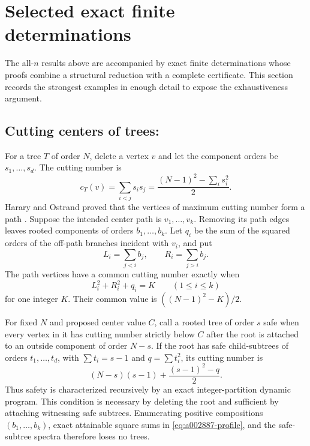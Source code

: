 \section{Selected exact finite determinations}
\label{sec:selected-exact}

The all-\(n\) results above are accompanied by exact finite determinations whose
proofs combine a structural reduction with a complete certificate.  This
section records the strongest examples in enough detail to expose the
exhaustiveness argument.

\subsection{Cutting centers of trees: \texorpdfstring{}{A002887}}

For a tree \(T\) of order \(N\), delete a vertex \(v\) and let the component
orders be \(s_1,\ldots,s_d\).  The cutting number is
\begin{equation}
 c_T(v)=\sum_{i<j}s_is_j
       =\frac{(N-1)^2-\sum_i s_i^2}{2}.
 \label{eq:a002887-cut}
\end{equation}
Harary and Ostrand proved that the vertices of maximum cutting number form a
path \citep{HararyOstrand1971}.  Suppose the intended center path is
\(v_1,\ldots,v_k\).  Removing its path edges leaves rooted components of orders
\(b_1,\ldots,b_k\).  Let \(q_i\) be the sum of the squared orders of the
off-path branches incident with \(v_i\), and put
\[
 L_i=\sum_{j<i}b_j,
 \qquad
 R_i=\sum_{j>i}b_j.
\]
The path vertices have a common cutting number exactly when
\begin{equation}
 L_i^2+R_i^2+q_i=K
 \qquad(1\le i\le k)
 \label{eq:a002887-profile}
\end{equation}
for one integer \(K\).  Their common value is
\(( (N-1)^2-K)/2\).

For fixed \(N\) and proposed center value \(C\), call a rooted tree of order
\(s\) safe when every vertex in it has cutting number strictly below \(C\)
after the root is attached to an outside component of order \(N-s\).  If the
root has safe child-subtrees of orders \(t_1,\ldots,t_d\), with
\(\sum t_i=s-1\) and \(q=\sum t_i^2\), its cutting number is
\begin{equation}
 (N-s)(s-1)+\frac{(s-1)^2-q}{2}.
 \label{eq:a002887-safe}
\end{equation}
Thus safety is characterized recursively by an exact integer-partition
dynamic program.  This condition is necessary by deleting the root and
sufficient by attaching witnessing safe subtrees.  Enumerating positive
compositions \((b_1,\ldots,b_k)\), exact attainable square sums in
\cref{eq:a002887-profile}, and the safe-subtree spectra therefore loses no
trees.

